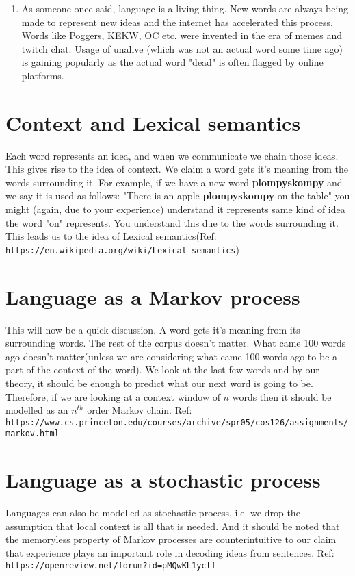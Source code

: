 \begin{enumerate}
    \item As someone once said, language is a living thing. New words are always being made to represent new ideas and the internet has accelerated this process. Words like Poggers, KEKW, OC etc. were invented in the era of memes and twitch chat. Usage of unalive (which was not an actual word some time ago) is gaining popularly as the actual word "dead" is often flagged by online platforms. 
\end{enumerate}




\section{Context and Lexical semantics}
Each word represents an idea, and when we communicate we chain those ideas. This gives rise to the idea of context. We claim a word gets it's meaning from the words surrounding it. For example, if we have a new word \textbf{plompyskompy} and we say it is used as follows: "There is an apple \textbf{plompyskompy} on the table" you might (again, due to your experience) understand it represents same kind of idea the word "on"  represents. You understand this due to the words surrounding it.  This leads us to the idea of Lexical semantics(Ref: \verb|https://en.wikipedia.org/wiki/Lexical_semantics|)



\section{Language as a Markov process}
This will now be a quick discussion. A word gets it's meaning from its surrounding words. The rest of the corpus doesn't matter. What came 100 words ago doesn't matter(unless we are considering what came 100 words ago to be a part of the context of the word). We look at the last few words and by our theory, it should be enough to predict what our next word is going to be. Therefore, if we are looking at a context window of $n$ words then it should be modelled as an $n^{th}$ order Markov chain. Ref:\\\verb|https://www.cs.princeton.edu/courses/archive/spr05/cos126/assignments/markov.html|

\section{Language as a stochastic process}
Languages can also be modelled as stochastic process, i.e. we drop the assumption that local context is all that is needed. And it should be noted that the memoryless property of Markov processes are counterintuitive to our claim that experience plays an important role in decoding ideas from sentences. Ref: \verb|https://openreview.net/forum?id=pMQwKL1yctf|

